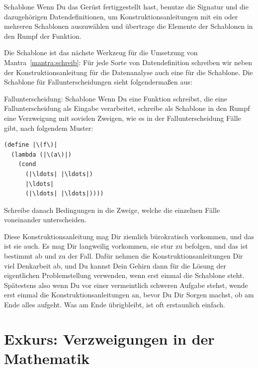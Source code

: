 \begin{konstruktionsanleitung}{Schablone}
  Wenn Du das Gerüst fertiggestellt hast, benutze die Signatur und die
  dazugehörigen Datendefinitionen, um Konstruktionsanleitungen mit ein
  oder mehreren Schablonen auszuwählen und übertrage die Elemente der
  Schablonen in den Rumpf der Funktion.
\end{konstruktionsanleitung}
%
Die Schablone ist das nächste Werkzeug für die Umsetzung von
Mantra~\ref{mantra:schreib}:
%
\mantraschreib*
%
\noindent Für jede Sorte von Datendefinition schreiben wir neben der
Konstruktionsanleitung für die Datenanalyse auch eine für die
Schablone.  Die Schablone für Fallunterscheidungen sieht
folgendermaßen aus:
%
\begin{konstruktionsanleitung}{Fallunterscheidung: Schablone}
  \label{ka:fallunterscheidung-schablone}
  Wenn Du eine Funktion schreibst, die eine Fallunterscheidung als
  Eingabe verarbeitet, schreibe als Schablone in den Rumpf eine
  Verzweigung mit sovielen Zweigen, wie es in der Fallunterscheidung
  Fälle gibt, nach folgendem Muster:
\begin{lstlisting}
(define |\(f\)|
  (lambda (|\(a\)|)
    (cond
      (|\ldots| |\ldots|)
      |\ldots|
      (|\ldots| |\ldots|))))
\end{lstlisting}
  Schreibe danach Bedingungen in die Zweige, welche die einzelnen
  Fälle voneinander unterscheiden.
\end{konstruktionsanleitung}
%
Diese Konstruktionsanleitung mag Dir ziemlich bürokratisch vorkommen,
und das ist sie auch.  Es mag Dir langweilig vorkommen, sie stur zu
befolgen, und das ist bestimmt ab und zu der Fall.  Dafür nehmen die
Konstruktionsanleitungen Dir viel Denkarbeit ab, und Du kannst Dein
Gehirn dann für die Lösung der eigentlichen Problemstellung verwenden,
wenn erst einmal die Schablone steht.  Spätestens also wenn Du vor
einer vermeintlich schweren Aufgabe stehst, wende erst einmal die
Konstruktionsanleitungen an, bevor Du Dir Sorgen machst, ob am Ende
alles aufgeht.  Was am Ende übrigbleibt, ist oft erstaunlich einfach.

\section{Exkurs: Verzweigungen in der Mathematik}

